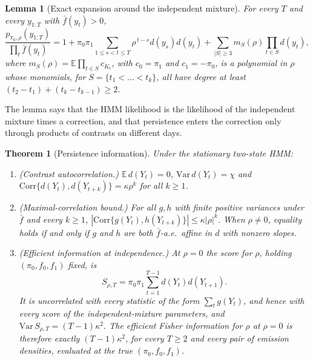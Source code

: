 \documentclass[12pt,letterpaper]{article}
\newcommand{\E}{\mathbb{E}}
\theoremstyle{plain}
\newtheorem{theorem}{Theorem}
\newtheorem{lemma}{Lemma}
\theoremstyle{remark}
\begin{document}
\begin{lemma}[Exact expansion around the independent mixture]\label{lem:expand}
For every $T$ and every $y_{1:T}$ with $\bar f(y_t)>0$,
\begin{equation}\label{eq:expand}
\frac{p_{\pi_0,\rho}(y_{1:T})}{\prod_{t}\bar f(y_t)}=1+\pi_0\pi_1\sum_{1\le s<t\le T}\rho^{\,t-s}d(y_s)d(y_t)+\sum_{|S|\ge3}m_S(\rho)\prod_{t\in S}d(y_t),
\end{equation}
where $m_S(\rho)=\E\prod_{t\in S}c_{K_t}$, with $c_0=\pi_1$ and $c_1=-\pi_0$, is a polynomial in $\rho$ whose monomials, for $S=\{t_1<\dots<t_k\}$, all have degree at least $(t_2-t_1)+(t_k-t_{k-1})\ge2$.
\end{lemma}

The lemma says that the HMM likelihood is the likelihood of the independent mixture times a correction, and that persistence enters the correction only through products of contrasts on different days.

\begin{theorem}[Persistence information]\label{thm:persist}
Under the stationary two-state HMM:
\begin{enumerate}
\item[(i)] (Contrast autocorrelation.) $\E\,d(Y_t)=0$, $\mathrm{Var}\,d(Y_t)=\chi$ and $\mathrm{Corr}\{d(Y_t),d(Y_{t+k})\}=\kappa\rho^k$ for all $k\ge1$.
\item[(ii)] (Maximal-correlation bound.) For all $g,h$ with finite positive variances under $\bar f$ and every $k\ge1$, $|\mathrm{Corr}\{g(Y_t),h(Y_{t+k})\}|\le\kappa|\rho|^k$. When $\rho\neq0$, equality holds if and only if $g$ and $h$ are both $\bar f$-a.e.\ affine in $d$ with nonzero slopes.
\item[(iii)] (Efficient information at independence.) At $\rho=0$ the score for $\rho$, holding $(\pi_0,f_0,f_1)$ fixed, is
\begin{equation}\label{eq:pscore}
S_{\rho,T}=\pi_0\pi_1\sum_{t=1}^{T-1}d(Y_t)d(Y_{t+1}).
\end{equation}
It is uncorrelated with every statistic of the form $\sum_tg(Y_t)$, and hence with every score of the independent-mixture parameters, and $\mathrm{Var}\,S_{\rho,T}=(T-1)\kappa^2$. The efficient Fisher information for $\rho$ at $\rho=0$ is therefore exactly $(T-1)\kappa^2$, for every $T\ge2$ and every pair of emission densities, evaluated at the true $(\pi_0,f_0,f_1)$.
\end{enumerate}
\end{theorem}
\end{document}
